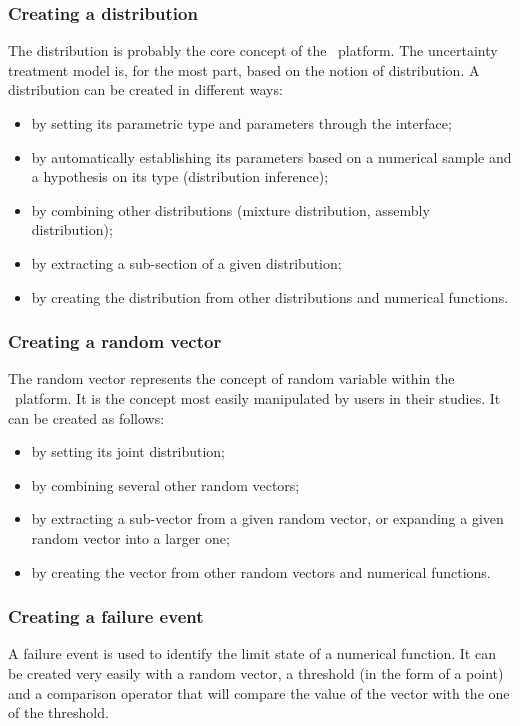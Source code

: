 \subsubsection{Creating a distribution}

The distribution is probably the core concept of the \OT\ platform. The uncertainty treatment model is, for the most part, based on the notion of distribution. A distribution can be created in different ways:
\begin{itemize}
\item by setting its parametric type and parameters through the interface;
\item by automatically establishing its parameters based on a numerical sample and a hypothesis on its type (distribution inference);
\item by combining other distributions (mixture distribution, assembly distribution);
\item by extracting a sub-section of a given distribution;
\item by creating the distribution from other distributions and numerical functions.
\end{itemize}

\subsubsection{Creating a random vector}

The random vector represents the concept of random variable within the \OT\ platform. It is the concept most easily manipulated by users in their studies. It can be created as follows:
\begin{itemize}
\item by setting its joint distribution;
\item by combining several other random vectors;
\item by extracting a sub-vector from a given random vector, or expanding a given random vector into a larger one;
\item by creating the vector from other random vectors and numerical functions.
\end{itemize}

\subsubsection{Creating a failure event}

A failure event is used to identify the limit state of a numerical function. It can be created very easily with a random vector, a threshold (in the form of a point) and a comparison operator that will compare the value of the vector with the one of the threshold.

